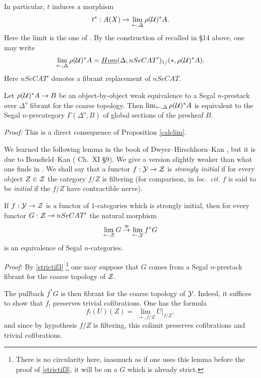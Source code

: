 In particular, $t$ induces a morphism
$$
t^{\ast} : A(X) \rightarrow \lim _{\leftarrow , \Delta} \rho ({\cal U} )^{\ast }A.
$$
Here the limit is the one of \cite{limits}. By the construction of \cite{limits}
recalled in \S 14 above, one may write
$$
\lim _{\leftarrow , \Delta} \rho ({\cal U} )^{\ast }A
= \underline{Hom}(\Delta , nSeCAT')_{1/}(\ast , \rho ({\cal U} )^{\ast }A).
$$
Here $nSeCAT'$ denotes a fibrant replacement of $nSeCAT$.

\begin{corollary}
Let $\rho ({\cal U} )^{\ast }A\rightarrow B$ be an object-by-object weak equivalence
to a Segal $n$-prestack over $\Delta ^o$ fibrant for the coarse topology. Then
\newline
$\lim _{\leftarrow , \Delta} \rho ({\cal U} )^{\ast }A$
is equivalent to the Segal $n$-precategory $\Gamma (\Delta ^o, B)$ of global
sections of the presheaf $B$.
\end{corollary}
{\em Proof:}
This is a direct consequence of Proposition \ref{calclim}.
\eop

We learned the following lemma in the book of Dwyer--Hirschhorn--Kan
\cite{DHK}, but it is due to Bousfield--Kan (\cite{BousfieldKan} Ch.~XI \S 9).
We give a version slightly weaker than what one finds in
\cite{BousfieldKan} \cite{DHK}. We shall say that a functor
$f:{\cal Y} \rightarrow {\cal Z}$ is {\em strongly initial} if for every object
$Z\in {\cal Z}$ the category $f/Z$ is filtering (for comparison, in
{\em loc.\ cit.} $f$ is said to be {\em initial} if the $f/Z$ have contractible
nerve).

\begin{lemma}
If $f:{\cal Y} \rightarrow {\cal Z}$ is a functor of $1$-categories which is strongly
initial, then for every functor $G: {\cal Z} \rightarrow nSeCAT'$ the natural morphism
$$ \lim _{\leftarrow , {\cal Z} } G \stackrel{\cong}{\rightarrow}
\lim _{\leftarrow , {\cal Y} } f^{\ast}G
$$
is an equivalence of Segal $n$-categories.
\end{lemma}
{\em Proof:}
By \ref{strictif3}
\footnote{There is no circularity here, inasmuch as if one uses this lemma
before the proof of \ref{strictif3}, it will be on a $G$ which is already
strict.}
one may suppose that $G$ comes from a Segal $n$-prestack fibrant for the coarse
topology of ${\cal Z}$.

The pullback $f^{\ast}G$ is then fibrant for the coarse topology of ${\cal Y}$.
Indeed, it suffices to show that $f_!$ preserves trivial cofibrations. One has
the formula
$$
f_!(U)(Z)= \lim _{\rightarrow , f/Z} U|_{f/Z},
$$
and since by hypothesis $f/Z$ is filtering, this colimit preserves cofibrations
and trivial cofibrations.

